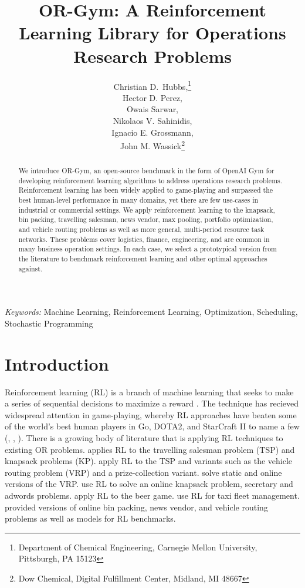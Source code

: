 \documentclass[12pt]{article}
\title{OR-Gym: A Reinforcement Learning Library for Operations Research Problems}
\author{
	Christian D.~Hubbs,\thanks{Department of Chemical Engineering, Carnegie Mellon University, Pittsburgh, PA 15123} \\
	Hector D. Perez,\footnotemark[1] \\
	Owais Sarwar,\footnotemark[1]\\
	Nikolaos V. Sahinidis,\footnotemark[1] \\
	Ignacio E. Grossmann,\footnotemark[1] \\
	John M. Wassick\thanks{Dow Chemical, Digital Fulfillment Center, Midland, MI 48667}
}
\providecommand{\keywords}[1]{\textit{Keywords:} #1}
\begin{document}
\maketitle

\begin{abstract}
We introduce OR-Gym, an open-source benchmark in the form of OpenAI Gym for developing reinforcement learning algorithms to address operations research problems.
Reinforcement learning has been widely applied to game-playing and surpassed the best human-level performance in many domains, yet there are few use-cases in industrial or commercial settings.
We apply reinforcement learning to the knapsack, bin packing, travelling salesman, news vendor, max pooling, portfolio optimization, and vehicle routing problems as well as more general, multi-period resource task networks. 
These problems cover logistics, finance, engineering, and are common in many business operation settings.
In each case, we select a prototypical version from the literature to benchmark reinforcement learning and other optimal approaches against. 
\end{abstract}

\keywords{Machine Learning, Reinforcement Learning, Optimization, Scheduling, Stochastic Programming}

\section{Introduction}

Reinforcement learning (RL) is a branch of machine learning that seeks to make a series of sequential decisions to maximize a reward \citep{Sutton2018}.
The technique has recieved widespread attention in game-playing, whereby RL approaches have beaten some of the world's best human players in Go, DOTA2, and StarCraft II to name a few (\citet{Silver2017}, \citet{Berner2019a}, \citet{Vinyals2019}). 
There is a growing body of literature that is applying RL techniques to existing OR problems.
\citet{Bello2019} applies RL to the travelling salesman problem (TSP) and knapsack problems (KP). 
\citet{Kool2019} apply RL to the TSP and variants such as the vehicle routing problem (VRP) and a prize-collection variant. 
\citet{Nazari2018} solve static and online versions of the VRP.
\citet{Kong2019} use RL to solve an online knapsack problem, secretary and adwords problems.
\citet{Oroojlooyjadid2017} apply RL to the beer game.
\citet{Lin2018} use RL for taxi fleet management. 
\citet{Balaji2019} provided versions of online bin packing, news vendor, and vehicle routing problems as well as models for RL benchmarks.
\end{document}
